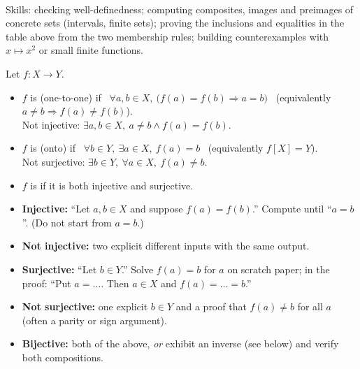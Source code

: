 \begin{planning}
\quad {}\quad {}\\[3pt]
Skills: checking well-definedness; computing composites, images and preimages of concrete sets (intervals, finite sets); proving the inclusions and equalities in the table above from the two membership rules; building counterexamples with $x\mapsto x^2$ or small finite functions.
\end{planning}


\begin{key}
Let $f:X\to Y$.
\begin{itemize}
\item $f$ is  (one-to-one) if \ $\forall a,b\in X,\ \big(f(a)=f(b)\Rightarrow a=b\big)$ \ (equivalently $a\neq b\Rightarrow f(a)\neq f(b)$).\\
  Not injective: $\exists a,b\in X,\ a\neq b\wedge f(a)=f(b)$.
\item $f$ is  (onto) if \ $\forall b\in Y,\ \exists a\in X,\ f(a)=b$ \ (equivalently $f[X]=Y$).\\
  Not surjective: $\exists b\in Y,\ \forall a\in X,\ f(a)\neq b$.
\item $f$ is  if it is both injective and surjective.
\end{itemize}
\end{key}

\begin{strategy}[Templates]
\begin{itemize}
\item \textbf{Injective:} ``Let $a,b\in X$ and suppose $f(a)=f(b)$.'' Compute until ``$a=b$''. (Do not start from $a=b$.)
\item \textbf{Not injective:} two explicit different inputs with the same output.
\item \textbf{Surjective:} ``Let $b\in Y$.'' Solve $f(a)=b$ for $a$ on scratch paper; in the proof: ``Put $a=\dots$. Then $a\in X$  and $f(a)=\dots=b$.''
\item \textbf{Not surjective:} one explicit $b\in Y$ and a proof that $f(a)\neq b$ for all $a$ (often a parity or sign argument).
\item \textbf{Bijective:} both of the above, \emph{or} exhibit an inverse (see below) and verify both compositions.
\end{itemize}
\end{strategy}

